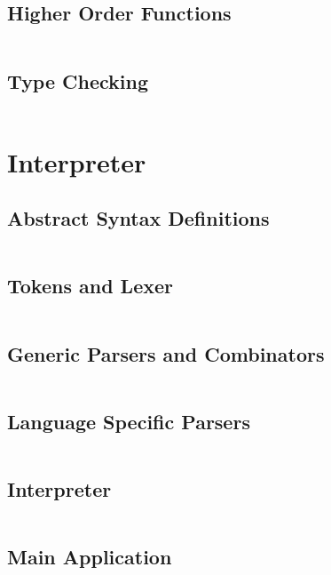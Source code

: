 \documentclass[a4paper,9pt]{article}
\newcommand{\hsfile}[1]{\inputminted[breaklines]{haskell}{../haskell/#1.hs}}
\begin{document}
\subsection{Higher Order Functions}
\hsfile{exam2010/problem_3}
\subsection{Type Checking}
\hsfile{exam2010/problem_4}
\section{Interpreter}
\subsection{Abstract Syntax Definitions}
\hsfile{interpreter/AbsSyn}
\subsection{Tokens and Lexer}
\hsfile{interpreter/Scanner}
\subsection{Generic Parsers and Combinators}
\hsfile{interpreter/ParserCombis2}
\subsection{Language Specific Parsers}
\hsfile{interpreter/Parser2}
\subsection{Interpreter}
\hsfile{interpreter/Interpreter}
\subsection{Main Application}
\hsfile{interpreter/Main}
\end{document}
